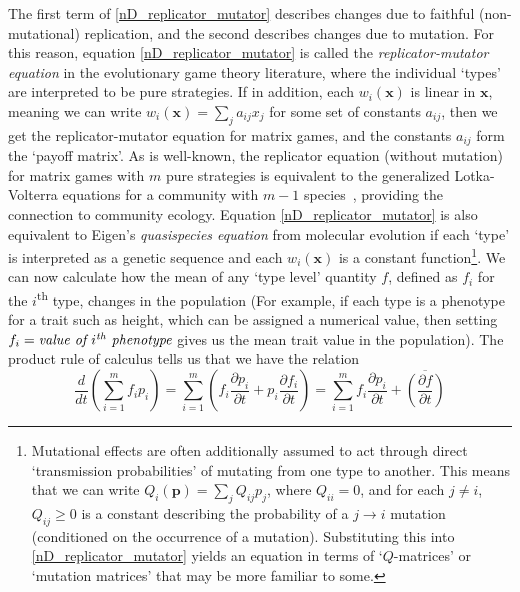 The first term of \eqref{nD_replicator_mutator} describes changes due to faithful (non-mutational) replication, and the second describes changes due to mutation. For this reason, equation \eqref{nD_replicator_mutator} is called the \emph{replicator-mutator equation} in the evolutionary game theory literature, where the individual `types' are interpreted to be pure strategies. If in addition, each $w_i(\mathbf{x})$ is linear in $\mathbf{x}$, meaning we can write $w_i(\mathbf{x}) = \sum_{j}a_{ij}x_j$ for some set of constants $a_{ij}$, then we get the replicator-mutator equation for matrix games, and the constants $a_{ij}$ form the `payoff matrix'. As is well-known, the replicator equation (without mutation) for matrix games with $m$ pure strategies is equivalent to the generalized Lotka-Volterra equations for a community with $m-1$ species~\citep{hofbauer_evolutionary_1998}, providing the connection to community ecology.  Equation \eqref{nD_replicator_mutator} is also equivalent to Eigen's \emph{quasispecies equation} from molecular evolution if each `type' is interpreted as a genetic sequence and each $w_i(\mathbf{x})$ is a constant function\footnote{Mutational effects are often additionally assumed to act through direct `transmission probabilities' of mutating from one type to another. This means that we can write $Q_i(\mathbf{p}) = \sum_j Q_{ij}p_j$, where $Q_{ii} = 0$, and for each $j \neq i$, $Q_{ij} \geq0$ is a constant describing the probability of a $j \to i$ mutation (conditioned on the occurrence of a mutation). Substituting this into \eqref{nD_replicator_mutator} yields an equation in terms of `$Q$-matrices' or `mutation matrices' that may be more familiar to some.}\citep{page_unifying_2002}. We can now calculate how the mean of any `type level' quantity $f$, defined as $f_i$ for the $i$\textsuperscript{th} type, changes in the population (For example, if each type is a phenotype for a trait such as height, which can be assigned a numerical value, then setting $f_i = \textit{value of $i\textsuperscript{th}$ phenotype}$ gives us the mean trait value in the population). The product rule of calculus tells us that we have the relation
\begin{equation}
\label{product_rule_for_nD_price}
\frac{d}{dt}\left(\sum\limits_{i=1}^{m}f_ip_i\right) = \sum\limits_{i=1}^{m}\left(f_i\frac{\partial p_i}{\partial t} + p_i\frac{\partial f_i}{\partial t}\right) = \sum\limits_{i=1}^{m}f_i\frac{\partial p_i}{\partial t} + \overline{\left(\frac{\partial f}{\partial t}\right)}
\end{equation}
